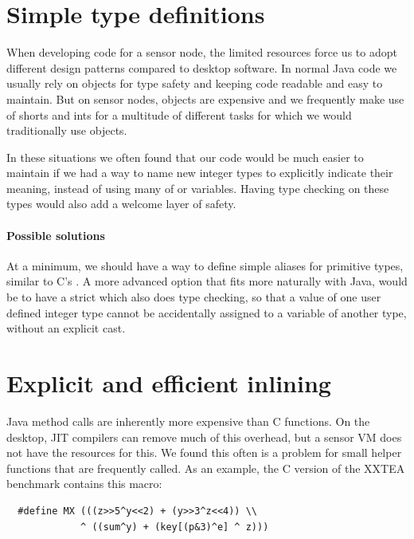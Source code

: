 \section{Simple type definitions}
\label{sec-typedef}
When developing code for a sensor node, the limited resources force us to adopt different design patterns compared to desktop software. In normal Java code we usually rely on objects for type safety and keeping code readable and easy to maintain. But on sensor nodes, objects are expensive and we frequently make use of shorts and ints for a multitude of different tasks for which we would traditionally use objects.

In these situations we often found that our code would be much easier to maintain if we had a way to name new integer types to explicitly indicate their meaning, instead of using many of  or  variables. Having type checking on these types would also add a welcome layer of safety.

\paragraph{Possible solutions}
At a minimum, we should have a way to define simple aliases for primitive types, similar to C's . A more advanced option that fits more naturally with Java, would be to have a strict  which also does type checking, so that a value of one user defined integer type cannot be accidentally assigned to a variable of another type, without an explicit cast.



\section{Explicit and efficient inlining}
\label{sec-inlining}
Java method calls are inherently more expensive than C functions. On the desktop, JIT compilers can remove much of this overhead, but a sensor VM does not have the resources for this. We found this often is a problem for small helper functions that are frequently called. As an example, the C version of the XXTEA benchmark contains this macro: 

\begin{verbatim}
  #define MX (((z>>5^y<<2) + (y>>3^z<<4)) \\
             ^ ((sum^y) + (key[(p&3)^e] ^ z)))
\end{verbatim}

